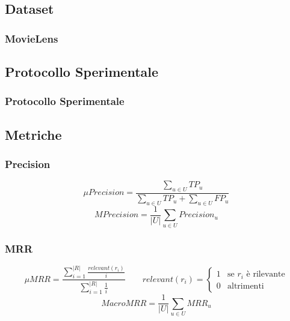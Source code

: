 \documentclass{beamer}
\begin{document}
\subsection{Dataset}


\begin{frame}
\frametitle{MovieLens}
\end{frame}


\subsection{Protocollo Sperimentale}


\begin{frame}
\frametitle{Protocollo Sperimentale}
\end{frame}

\subsection{Metriche}
\begin{frame}
\frametitle{Precision}
\begin{equation*}
	\mu Precision =\frac{\sum\limits_{u\in U}^{}TP_u}{\sum\limits_{u\in U}^{}TP_u+\sum\limits_{u\in U}^{}FP_u}
\end{equation*}
\begin{equation*}
	MPrecision =\frac{1}{|U|}\sum\limits_{u\in U}{Precision_u}
\end{equation*}
\end{frame}


\begin{frame}
	\frametitle{MRR}
	\begin{equation*}
		\mu MRR =\frac{\sum\limits_{i=1}^{|R|}{\frac{relevant(r_i)}{i}}}{\sum\limits_{i=1}^{|R|}{\frac{1}{i}}} \qquad relevant(r_i)=\begin{cases} 1 & \mbox{se }r_i\mbox{ è rilevante} \\ 0 & \mbox{altrimenti}
		\end{cases}
	\end{equation*}
	\begin{equation*}
		MacroMRR =\frac{1}{|U|}\sum_{u\in U}{MRR_u}
	\end{equation*}
\end{frame}
\end{document}
